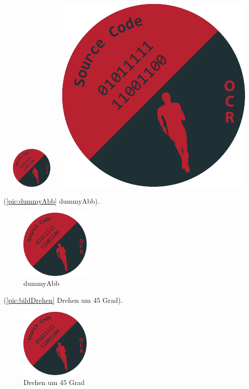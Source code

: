 \includegraphics[height=2cm,width=3cm]{img/logo.pdf}
\includegraphics[angle=45, scale=.2]{img/logo.pdf}

(\autoref{pic:dummyAbb} dummyAbb).    %
\begin{figure}[!hb]%
	\centering
  \includegraphics[width=0.3\textwidth]{img/logo.pdf}
	\caption{dummyAbb}%
	\label{pic:dummyAbb}%
\end{figure}

(\autoref{pic:bildDrehen} Drehen um 45 Grad).    %
\begin{figure}[!hb]%
	\centering
  \includegraphics[angle=45,width=0.3\textwidth]{img/logo.pdf}
	\caption{Drehen um 45 Grad}%
	\label{pic:bildDrehen}%
\end{figure}

